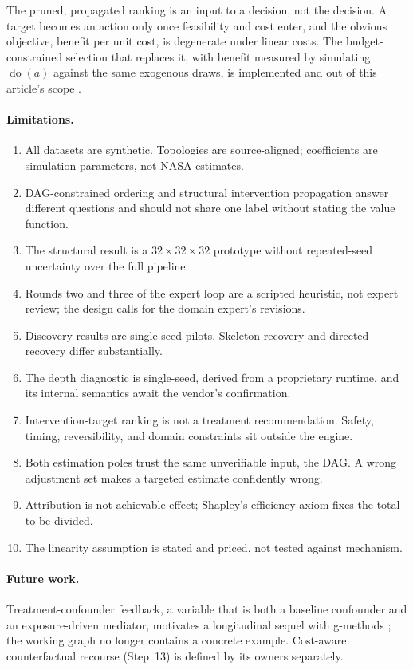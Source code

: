 \documentclass[11pt]{article}
\newcommand{\dox}{\operatorname{do}}
\begin{document}
The pruned, propagated ranking is an input to a decision, not the decision.
A target becomes an action only once feasibility and cost enter, and the
obvious objective, benefit per unit cost, is degenerate under linear costs.
The budget-constrained selection that replaces it, with benefit measured by
simulating $\dox(a)$ against the same exogenous draws, is implemented and
out of this article's scope \citep{Karimi2021,Karimi2020,Mothilal2020}.

\paragraph{Limitations.}
\begin{enumerate}
\item All datasets are synthetic. Topologies are source-aligned; coefficients
  are simulation parameters, not NASA estimates.
\item DAG-constrained ordering and structural intervention propagation answer
  different questions and should not share one label without stating the
  value function.
\item The structural result is a $32\times32\times32$ prototype without
  repeated-seed uncertainty over the full pipeline.
\item Rounds two and three of the expert loop are a scripted heuristic, not
  expert review; the design calls for the domain expert's revisions.
\item Discovery results are single-seed pilots. Skeleton recovery and directed
  recovery differ substantially.
\item The depth diagnostic is single-seed, derived from a proprietary runtime,
  and its internal semantics await the vendor's confirmation.
\item Intervention-target ranking is not a treatment recommendation. Safety,
  timing, reversibility, and domain constraints sit outside the engine.
\item Both estimation poles trust the same unverifiable input, the DAG. A
  wrong adjustment set makes a targeted estimate confidently wrong.
\item Attribution is not achievable effect; Shapley's efficiency axiom fixes
  the total to be divided.
\item The linearity assumption is stated and priced, not tested against
  mechanism.
\end{enumerate}

\paragraph{Future work.} Treatment-confounder feedback, a variable that is
both a baseline confounder and an exposure-driven mediator, motivates a
longitudinal sequel with g-methods \citep{Robins2000}; the working graph no
longer contains a concrete example. Cost-aware counterfactual recourse
(Step~13) is defined by its owners separately.
\end{document}
